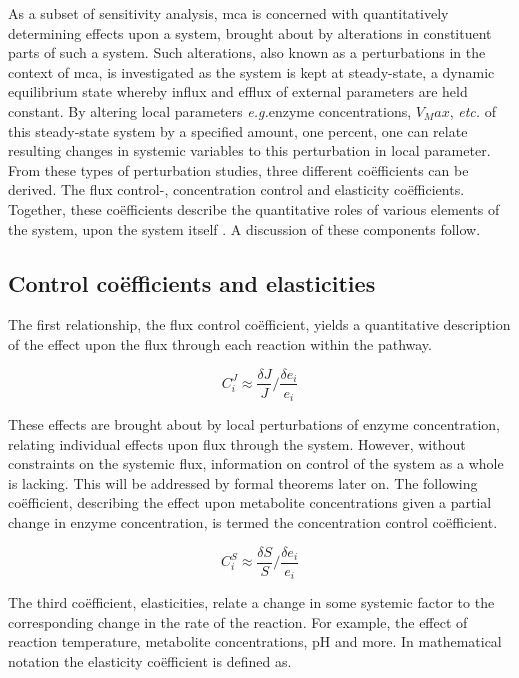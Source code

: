 As a subset of sensitivity analysis, \gls{mca} is concerned with quantitatively determining effects upon a system, brought about by alterations in constituent parts of such a system. Such alterations, also known as a perturbations in the context of \gls{mca}, is investigated as the system is kept at \gls{steady-state}, a dynamic equilibrium state whereby influx and efflux of external parameters are held constant. By altering local parameters \textit{e.g.}enzyme concentrations, $V_Max$, \textit{etc.} of this \gls{steady-state} system by a specified amount, one percent, one can relate resulting changes in systemic variables to this perturbation in local parameter. From these types of perturbation studies, three different co\"efficients can be derived. The flux control-, concentration control and elasticity co\"efficients. Together, these co\"efficients describe the quantitative roles of various elements of the system, upon the system itself \citep{Kacser1979}. A discussion of these components follow.

\subsection{Control co\"efficients and elasticities} 
The first relationship, the flux control co\"efficient, yields a quantitative description of the effect upon the flux through each reaction within the pathway.

\begin{equation}
C^{J}_{i}\approx\dfrac {\delta J}{J}/\dfrac {\delta e_{i}}{e_{i}}
\end{equation}

These effects are brought about by local perturbations of enzyme concentration, relating individual effects upon flux through the system. However, without constraints on the systemic flux, information on control of the system as a whole is lacking. This will be addressed by formal theorems later on. The following co\"efficient, describing the effect upon metabolite concentrations given a partial change in enzyme concentration, is termed the concentration control co\"efficient.

\begin{equation}
C^{S}_{i}\approx\dfrac{\delta S}{S}/\dfrac{\delta e_{i}}{e_{i}}
\end{equation}

The third co\"efficient, elasticities, relate a change in some systemic factor to the corresponding change in the rate of the reaction. For example, the effect of reaction temperature, metabolite concentrations, pH and more. In mathematical notation the elasticity co\"efficient is defined as.

